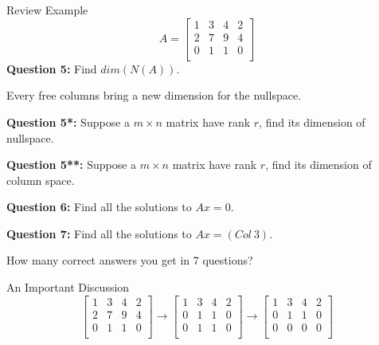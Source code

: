\documentclass{beamer}
\begin{document}
\begin{frame}{Review Example}
\begin{equation*}
    A=\left[ \begin{matrix}
        1&		3&		4&		2\\
        2&		7&		9&		4\\
        0&		1&		1&		0\\
    \end{matrix} \right]
\end{equation*}
\textbf{Question 5:} Find $dim(N(A))$.

\vspace{3pt}
Every free columns bring a new dimension for the nullspace.

\vspace{5pt}
\textbf{Question 5*:} Suppose a $m \times n$ matrix have rank $r$, find its dimension of nullspace.

\vspace{5pt}
\textbf{Question 5**:} Suppose a $m \times n$ matrix have rank $r$, find its dimension of column space.

\vspace{5pt}
\textbf{Question 6:} Find all the solutions to $Ax=0$.

\vspace{5pt}
\textbf{Question 7:} Find all the solutions to $Ax=(Col\:3)$.

\vspace{3pt}
How many correct answers you get in 7 questions?
\end{frame}

\begin{frame}{An Important Discussion}
\begin{equation*}
    \left[ \begin{matrix}
        1&		3&		4&		2\\
        2&		7&		9&		4\\
        0&		1&		1&		0\\
    \end{matrix} \right] \rightarrow \left[ \begin{matrix}
        1&		3&		4&		2\\
        0&		1&		1&		0\\
        0&		1&		1&		0\\
    \end{matrix} \right] \rightarrow \left[ \begin{matrix}
        1&		3&		4&		2\\
        0&		1&		1&		0\\
        0&		0&		0&		0\\
    \end{matrix} \right]
\end{equation*}
\end{frame}
\end{document}

